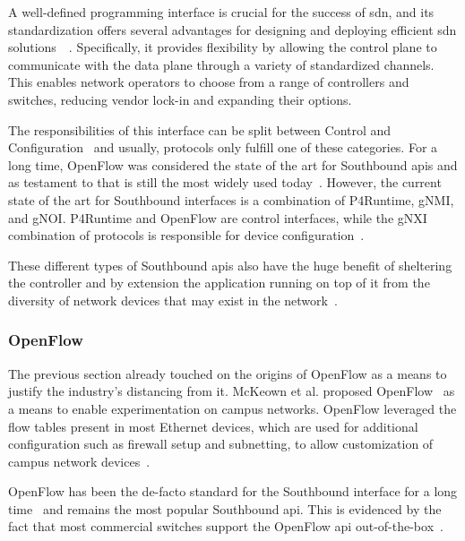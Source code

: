 A well-defined programming interface is crucial for the success of \gls{sdn}, and its standardization offers several advantages for designing and deploying efficient \gls{sdn} solutions~\cite{latif_comprehensive_2020}~\cite{kreutz_software-defined_2015}. Specifically, it provides flexibility by allowing the control plane to communicate with the data plane through a variety of standardized channels. This enables network operators to choose from a range of controllers and switches, reducing vendor lock-in and expanding their options.

The responsibilities of this interface can be split between Control and Configuration~\cite{peterson_software-defined_2021} and usually, protocols only fulfill one of these categories. For a long time, OpenFlow was considered the state of the art for Southbound \glspl{api} and as testament to that is still the most widely used today~\cite{latif_comprehensive_2020}. However, the current state of the art for Southbound interfaces is a combination of P4Runtime, gNMI, and gNOI. P4Runtime and OpenFlow are control interfaces, while the gNXI combination of protocols is responsible for device configuration~\cite{peterson_software-defined_2021}.

These different types of Southbound \glspl{api} also have the huge benefit of sheltering the controller and by extension the application running on top of it from the diversity of network devices that may exist in the network~\cite{peterson_software-defined_2021}. 

\subsubsection{OpenFlow}
The previous section already touched on the origins of OpenFlow as a means to justify the industry's distancing from it. McKeown et al. proposed OpenFlow~\cite{mckeown_openflow_2008} as a means to enable experimentation on campus networks. OpenFlow leveraged the flow tables present in most Ethernet devices, which are used for additional configuration such as firewall setup and subnetting, to allow customization of campus network devices~\cite{xia_survey_2015}. 

OpenFlow has been the de-facto standard for the Southbound interface for a long time~\cite{nunes_survey_2014} and remains the most popular Southbound \gls{api}. This is evidenced by the fact that most commercial switches support the OpenFlow \gls{api} out-of-the-box~\cite{kreutz_software-defined_2015}.

